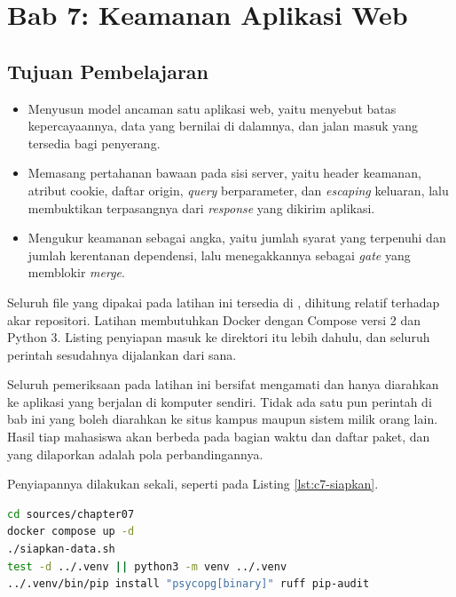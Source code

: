 \section{Bab 7: Keamanan Aplikasi Web}

\subsection*{Tujuan Pembelajaran}
\begin{itemize}
  \item Menyusun model ancaman satu aplikasi web, yaitu menyebut batas
        kepercayaannya, data yang bernilai di dalamnya, dan jalan masuk yang
        tersedia bagi penyerang.
  \item Memasang pertahanan bawaan pada sisi server, yaitu header keamanan,
        atribut cookie, daftar origin, \textit{query} berparameter, dan
        \textit{escaping} keluaran, lalu membuktikan terpasangnya dari
        \textit{response} yang dikirim aplikasi.
  \item Mengukur keamanan sebagai angka, yaitu jumlah syarat yang terpenuhi
        dan jumlah kerentanan dependensi, lalu menegakkannya sebagai
        \textit{gate} yang memblokir \textit{merge}.
\end{itemize}

Seluruh file yang dipakai pada latihan ini tersedia di
, dihitung relatif terhadap akar repositori.
Latihan membutuhkan Docker dengan Compose versi 2 dan Python 3. Listing
penyiapan masuk ke direktori itu lebih dahulu, dan seluruh perintah sesudahnya
dijalankan dari sana.

Seluruh pemeriksaan pada latihan ini bersifat mengamati dan hanya diarahkan
ke aplikasi yang berjalan di komputer sendiri. Tidak ada satu pun perintah di
bab ini yang boleh diarahkan ke situs kampus maupun sistem milik orang lain.
Hasil tiap mahasiswa akan berbeda pada bagian waktu dan daftar paket, dan
yang dilaporkan adalah pola perbandingannya.

Penyiapannya dilakukan sekali, seperti pada Listing \ref{lst:c7-siapkan}.

\begin{lstlisting}[language=bash, caption={Menyiapkan basis data dan venv, memakai \berkas{sources/chapter07/siapkan-data.sh}}, label={lst:c7-siapkan}]
cd sources/chapter07
docker compose up -d
./siapkan-data.sh
test -d ../.venv || python3 -m venv ../.venv
../.venv/bin/pip install "psycopg[binary]" ruff pip-audit
\end{lstlisting}

